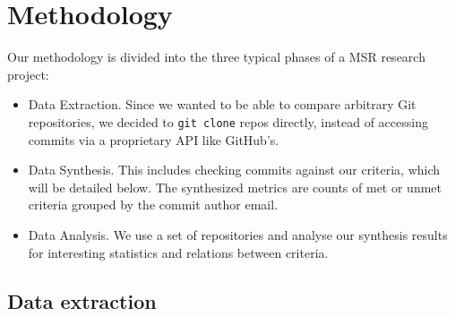 \section{Methodology}

Our methodology is divided into the three typical phases of a MSR research project:


\begin{itemize}
  \item Data Extraction. Since we wanted to be able to compare arbitrary Git repositories, we decided to \texttt{git clone} repos directly, instead of accessing commits via a proprietary API like GitHub's.
  \item Data Synthesis. This includes checking commits against our criteria, which will be detailed below. The synthesized metrics are counts of met or unmet criteria grouped by the commit author email.
  \item Data Analysis. We use a set of repositories and analyse our synthesis results for interesting statistics and relations between criteria.
\end{itemize}

\subsection{Data extraction}

%
%

